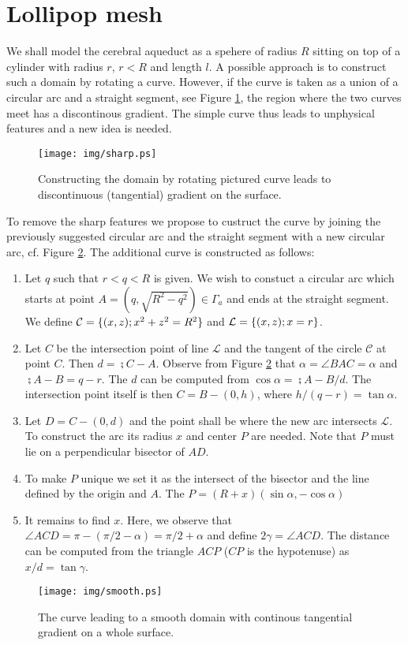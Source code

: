 \section{Lollipop mesh}
We shall model the cerebral aqueduct as a spehere of radius $R$ sitting on top
of a cylinder with radius $r$, $r<R$ and length $l$. A possible approach is to
construct such a domain by rotating a curve. However, if the curve is taken as a
union of a circular arc and a straight segment, see Figure \ref{fig:sharp}, the 
region where the two curves meet has a discontinous gradient. The simple curve
thus leads to unphysical features and a new idea is needed.
%
\begin{figure}[h!]
\centering
  \texttt{[image: img/sharp.ps]}
\caption{Constructing the domain by rotating pictured curve leads to
discontinuous (tangential) gradient on the surface.
}
\label{fig:sharp}
\end{figure}

To remove the sharp features we propose to custruct the curve by joining the
previously suggested circular arc and the straight segment with a new circular
arc, cf. Figure \ref{fig:smooth}. The additional curve is constructed as
follows:
%
\begin{enumerate}
  \item Let $q$ such that $r<q<R$ is given. We wish to constuct a circular arc
    which starts at point $A=(q, \sqrt{R^2-q^2})\in\Gamma_a$ and ends at the
    straight segment. We define $\mathcal{C}=\{(x, z); x^2+z^2=R^2\}$ and
    $\mathcal{L}=\{(x, z); x=r\}$.
  \item Let $C$ be the intersection point of line $\mathcal{L}$ and the tangent of
    the circle $\mathcal{C}$ at point $C$. Then $d=\semi{C-A}$. Observe from
    Figure \ref{fig:smooth} that $\alpha=\angle BAC=\alpha$ and
    $\semi{A-B}=q-r$. The $d$ can be computed from $\cos\alpha=\semi{A-B}/d$.
    The intersection point itself is then $C=B-(0, h)$, where
    $h/(q-r)=\tan\alpha$.
  \item Let $D=C-(0, d)$ and the point shall be where the new arc intersects
    $\mathcal{L}$. To construct the arc its radius $x$ and center $P$ are needed.
    Note that $P$ must lie on a perpendicular bisector of $AD$.
  \item To make $P$ unique we set it as the intersect of the bisector
    and the line defined by the origin and $A$. The $P=(R+x)(\sin\alpha,-\cos\alpha)$
  \item It remains to find $x$. Here, we observe that $\angle
    ACD=\pi-(\pi/2-\alpha)=\pi/2+\alpha$ and define $2\gamma=\angle ACD$.
    The distance can be computed from the triangle $ACP$ ($CP$ is the hypotenuse)
    as $x/d=\tan{\gamma}$.
\end{enumerate}
\begin{figure}[h!]
\centering
  \texttt{[image: img/smooth.ps]}
\caption{The curve leading to a smooth domain with continous tangential gradient
  on a whole surface.}
  \label{fig:smooth}
\end{figure}

